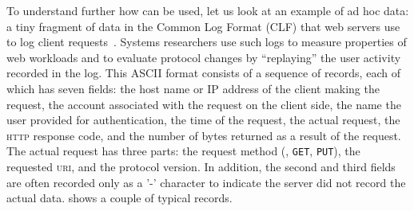 \documentclass[11pt]{article}
\begin{document}


To understand further how \pads{} can be used,
let us look at an example of ad hoc data:
a tiny fragment of data in the Common Log Format (CLF) that web
servers use to log client requests~\cite{wpp}.  
Systems researchers use such logs to measure
properties of web workloads and to evaluate protocol changes
by ``replaying'' the user activity recorded in the log.
This ASCII format consists of a sequence of
records, each of which has seven fields: the host name or IP address
of the client making the request, the account associated with the
request on the client side, the name the user provided for
authentication, the time of the request, the actual request, the
\textsc{http} response code, and the number of bytes returned as a
result of the request.  The actual request has three parts: the
request method (\eg, \texttt{GET}, \texttt{PUT}), the requested
\textsc{uri}, and the protocol version.  In addition, the second and
third fields are often recorded only as a '-' character to indicate
the server did not record the actual data.  
shows a couple of typical records.
\end{document}
